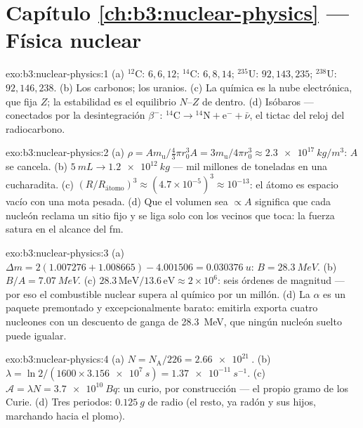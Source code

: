 \section*{Capítulo \ref{ch:b3:nuclear-physics} --- Física nuclear}

\begin{solution}{exo:b3:nuclear-physics:1}
(a) $^{12}$C: $6, 6, 12$; $^{14}$C: $6, 8, 14$; $^{235}$U:
$92, 143, 235$; $^{238}$U: $92, 146, 238$. (b) Los carbonos; los
uranios. (c) La química es la nube electrónica, que fija $Z$; la
estabilidad es el equilibrio $N$--$Z$ de dentro. (d) Isóbaros ---
conectados por la desintegración $\beta^-$: $^{14}\text{C} \to {}^{14}\text{N}
+ \text{e}^- + \bar\nu$, el tictac del reloj del radiocarbono.
\end{solution}

\begin{solution}{exo:b3:nuclear-physics:2}
(a) $\rho = Am_{\text{u}}/\tfrac43\pi r_0^3A =
3m_{\text{u}}/4\pi r_0^3 \approx \qty{2.3e17}{kg/m^3}$: $A$ se
cancela. (b) $\qty{5}{mL} \to \qty{1.2e12}{kg}$ --- mil millones de
toneladas en una cucharadita. (c) $(R/R_{\text{átomo}})^3 \approx
(4.7\times10^{-5})^3 \approx 10^{-13}$: el átomo es espacio vacío
con una mota pesada. (d) Que el volumen sea $\propto A$ significa que cada nucleón
reclama un sitio fijo y se liga solo con los vecinos que toca: la
fuerza satura en el alcance del \unit{fm}.
\end{solution}

\begin{solution}{exo:b3:nuclear-physics:3}
(a) $\Delta m = 2(1.007276 + 1.008665) - 4.001506 =
\qty{0.030376}{u}$: $B = \qty{28.3}{MeV}$. (b) $B/A =
\qty{7.07}{MeV}$. (c) $28.3\,\text{MeV}/13.6\,\text{eV} \approx
2\times10^6$: seis órdenes de magnitud --- por eso el combustible nuclear
supera al químico por un millón. (d) La $\alpha$ es un
paquete premontado y excepcionalmente barato: emitirla exporta
cuatro nucleones con un descuento de ganga de \qty{28.3}{MeV}, que ningún
nucleón suelto puede igualar.
\end{solution}

\begin{solution}{exo:b3:nuclear-physics:4}
(a) $N = N_{\text{A}}/226 = \qty{2.66e21}{}$. (b) $\lambda =
\ln2/(1600\times\qty{3.156e7}{s}) = \qty{1.37e-11}{s^{-1}}$. (c)
$\mathcal A = \lambda N = \qty{3.7e10}{Bq}$: un curio, por
construcción --- el propio gramo de los Curie. (d) Tres periodos:
$\qty{0.125}{g}$ de radio (el resto, ya radón y sus
hijos, marchando hacia el plomo).
\end{solution}

